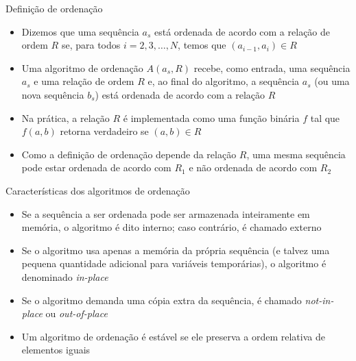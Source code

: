 \begin{frame}[fragile]{Definição de ordenação}

    \begin{itemize}
        \item Dizemos que uma sequência $a_s$ está ordenada de acordo com a relação de 
            ordem $R$ se, para todos $i = 2, 3, \ldots, N$, temos que $(a_{i - 1}, a_i) \in R$

        \item Uma algoritmo de ordenação $A(a_s, R)$ recebe, como entrada, uma sequência $a_s$ e 
            uma relação de ordem $R$ e, ao final do algoritmo, a sequência $a_s$ (ou uma nova
            sequência $b_s$) está ordenada de acordo com a relação $R$

        \item Na prática, a relação $R$ é implementada como uma função binária $f$ tal que
            $f(a, b)$ retorna verdadeiro se $(a, b)\in R$

        \item Como a definição de ordenação depende da relação $R$, uma mesma sequência pode
            estar ordenada de acordo com $R_1$ e não ordenada de acordo com $R_2$

    \end{itemize}

\end{frame}

\begin{frame}[fragile]{Características dos algoritmos de ordenação}

    \begin{itemize}
        \item Se a sequência a ser ordenada pode ser armazenada inteiramente em memória, o 
            algoritmo é dito interno; caso contrário, é chamado externo

        \item Se o algoritmo usa apenas a memória da própria sequência (e talvez uma pequena
            quantidade adicional para variáveis temporárias), o algoritmo é denominado
            \textit{in-place}

        \item Se o algoritmo demanda uma cópia extra da sequência, é chamado \textit{not-in-place}
            ou \textit{out-of-place}

        \item Um algoritmo de ordenação é estável se ele preserva a ordem relativa de elementos 
            iguais

    \end{itemize}

\end{frame}
